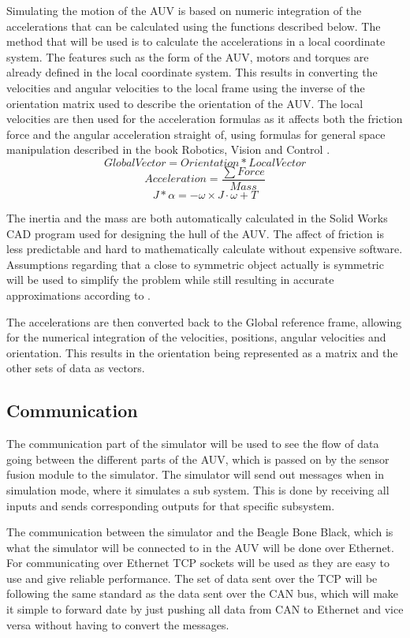 Simulating the motion of the AUV is based on numeric integration of the accelerations that can be calculated using the functions described below. The method that will be used is to calculate the accelerations in a local coordinate system. The features such as the form of the AUV, motors and torques are already defined in the local coordinate system. This results in converting the velocities and angular velocities to the local frame using the inverse of the orientation matrix used to describe the orientation of the AUV. The local velocities are then used for the acceleration formulas as it affects both the friction force and the angular acceleration straight of, using formulas for general space manipulation described in the book Robotics, Vision and Control \cite{book:corke2013}.
\begin{equation}
Global Vector = Orientation*Local Vector
\end{equation}
\begin{equation}
Acceleration = \frac{\sum Force}{Mass}
\end{equation}
\begin{equation}
J*\alpha = - \omega \times J \cdot\omega + T 
\end{equation}


The inertia and the mass are both automatically calculated in the Solid Works CAD program used for designing the hull of the AUV. The affect of friction is less predictable and hard to mathematically calculate without expensive software. Assumptions regarding that a close to symmetric object actually is symmetric will be used to simplify the problem while still resulting in accurate approximations according to \cite{4772083}.

The accelerations are then converted back to the Global reference frame, allowing for the numerical integration of the velocities, positions, angular velocities and orientation. This results in the orientation being represented as a matrix and the other sets of data as vectors.
\subsection{Communication}

The communication part of the simulator will be used to see the flow of data going between the different parts of the AUV, which is passed on by the sensor fusion module to the simulator. The simulator will send out messages when in simulation mode, where it simulates a sub system. This is done by receiving all inputs and sends corresponding outputs for that specific subsystem.

The communication between the simulator and the Beagle Bone Black, which is what the simulator will be connected to in the AUV will be done over Ethernet. For communicating over Ethernet TCP sockets will be used as they are easy to use and give reliable performance. The set of data sent over the TCP will be following the same standard as the data sent over the CAN bus, which will make it simple to forward date by just pushing all data from CAN to Ethernet and vice versa without having to convert the messages.

